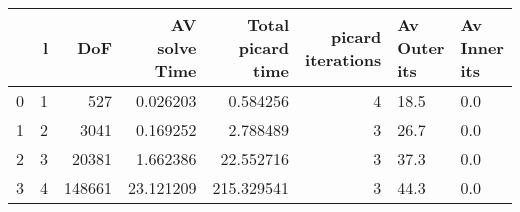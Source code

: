 \begin{tabular}{lrrrrrll}
\toprule
{} &  l &     DoF &  AV solve Time &  Total picard time &  picard iterations & Av Outer its & Av Inner its \\
\midrule
0 &  1 &     527 &       0.026203 &           0.584256 &                  4 &         18.5 &          0.0 \\
1 &  2 &    3041 &       0.169252 &           2.788489 &                  3 &         26.7 &          0.0 \\
2 &  3 &   20381 &       1.662386 &          22.552716 &                  3 &         37.3 &          0.0 \\
3 &  4 &  148661 &      23.121209 &         215.329541 &                  3 &         44.3 &          0.0 \\
\bottomrule
\end{tabular}

